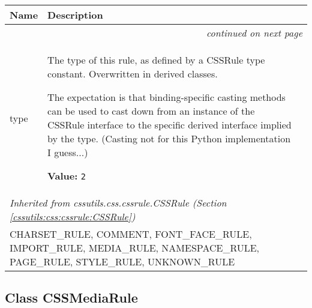     \vspace{-1cm}
\hspace{\varindent}\begin{longtable}{|p{\varnamewidth}|p{\vardescrwidth}|l}
\cline{1-2}
\cline{1-2} \centering \textbf{Name} & \centering \textbf{Description}& \\
\cline{1-2}
\endhead\cline{1-2}\multicolumn{3}{r}{\small\textit{continued on next page}}\\\endfoot\cline{1-2}
\endlastfoot\raggedright t\-y\-p\-e\- & \raggedright The type of this rule, as defined by a CSSRule type constant.
Overwritten in derived classes.

The expectation is that binding-specific casting methods can be used to
cast down from an instance of the CSSRule interface to the specific
derived interface implied by the type.
(Casting not for this Python implementation I guess...)

\textbf{Value:} 
{\tt 2}&\\
\cline{1-2}
\multicolumn{2}{|l|}{\textit{Inherited from cssutils.css.cssrule.CSSRule \textit{(Section \ref{cssutils:css:cssrule:CSSRule})}}}\\
\multicolumn{2}{|p{\varwidth}|}{\raggedright CHARSET\_RULE, COMMENT, FONT\_FACE\_RULE, IMPORT\_RULE, MEDIA\_RULE, NAMESPACE\_RULE, PAGE\_RULE, STYLE\_RULE, UNKNOWN\_RULE}\\
\cline{1-2}
\end{longtable}



\subsection{Class CSSMediaRule}

